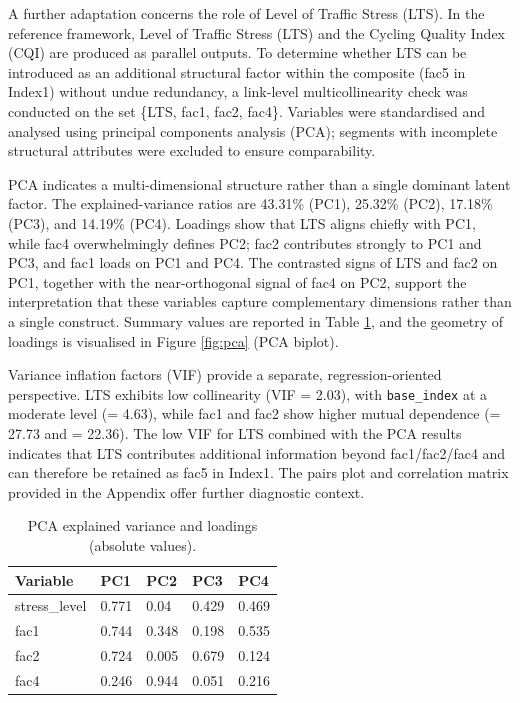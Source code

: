 \documentclass[
  12pt,
  oneside]{book}
\begin{document}
A further adaptation concerns the role of Level of Traffic Stress (LTS). In the reference framework, Level of Traffic Stress (LTS) and the Cycling Quality Index (CQI) are produced as parallel outputs. To determine whether LTS can be introduced as an additional structural factor within the composite (fac5 in Index1) without undue redundancy, a link-level multicollinearity check was conducted on the set \{LTS, fac1, fac2, fac4\}. Variables were standardised and analysed using principal components analysis (PCA); segments with incomplete structural attributes were excluded to ensure comparability.

PCA indicates a multi-dimensional structure rather than a single dominant latent factor. The explained-variance ratios are 43.31\% (PC1), 25.32\% (PC2), 17.18\% (PC3), and 14.19\% (PC4). Loadings show that LTS aligns chiefly with PC1, while fac4 overwhelmingly defines PC2; fac2 contributes strongly to PC1 and PC3, and fac1 loads on PC1 and PC4. The contrasted signs of LTS and fac2 on PC1, together with the near-orthogonal signal of fac4 on PC2, support the interpretation that these variables capture complementary dimensions rather than a single construct. Summary values are reported in Table \ref{tab:PCA}, and the geometry of loadings is visualised in Figure \ref{fig:pca} (PCA biplot).

Variance inflation factors (VIF) provide a separate, regression-oriented perspective. LTS exhibits low collinearity (VIF = 2.03), with \texttt{base\_index} at a moderate level (= 4.63), while fac1 and fac2 show higher mutual dependence (= 27.73 and = 22.36). The low VIF for LTS combined with the PCA results indicates that LTS contributes additional information beyond fac1/fac2/fac4 and can therefore be retained as fac5 in Index1. The pairs plot and correlation matrix provided in the Appendix offer further diagnostic context.

\begin{table}[H]
\centering
\caption{\label{tab:PCA}PCA explained variance and loadings (absolute values).}
\centering
\begin{tabular}[t]{lllll}
\toprule
\textbf{Variable} & \textbf{PC1} & \textbf{PC2} & \textbf{PC3} & \textbf{PC4}\\
\midrule
stress\_level & 0.771 & 0.04 & 0.429 & 0.469\\
fac1 & 0.744 & 0.348 & 0.198 & 0.535\\
fac2 & 0.724 & 0.005 & 0.679 & 0.124\\
fac4 & 0.246 & 0.944 & 0.051 & 0.216\\
\bottomrule
\end{tabular}
\end{table}
\end{document}
